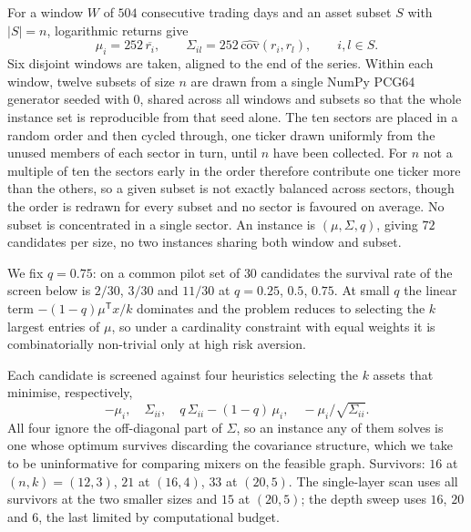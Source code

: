 For a window $W$ of $504$ consecutive trading days and an asset subset $S$ with $|S|=n$, logarithmic returns give
\begin{equation}
\mu_i = 252\,\overline{r_i}, \qquad \Sigma_{il} = 252\,\widehat{\mathrm{cov}}(r_i,r_l), \qquad i,l\in S .
  \label{eq:moments}
\end{equation}
Six disjoint windows are taken, aligned to the end of the series. Within each window, twelve subsets of size $n$ are drawn from a single NumPy PCG64 generator seeded with $0$, shared across all windows and subsets so that the whole instance set is reproducible from that seed alone. The ten sectors are placed in a random order and then cycled through, one ticker drawn uniformly from the unused members of each sector in turn, until $n$ have been collected. For $n$ not a multiple of ten the sectors early in the order therefore contribute one ticker more than the others, so a given subset is not exactly balanced across sectors, though the order is redrawn for every subset and no sector is favoured on average. No subset is concentrated in a single sector. An instance is $(\mu,\Sigma,q)$, giving $72$ candidates per size, no two instances sharing both window and subset.

We fix $q=0.75$: on a common pilot set of $30$ candidates
the survival rate of the screen below is $2/30$, $3/30$ and $11/30$ at $q=0.25$, $0.5$, $0.75$. At small $q$ the linear term $-(1-q)\mu^{\mathsf T}x/k$ dominates and the problem reduces to selecting the $k$ largest entries of $\mu$, so under a cardinality constraint with equal weights it is combinatorially non-trivial only at high risk aversion.

Each candidate is screened against four heuristics selecting the $k$ assets that minimise, respectively,
\begin{equation}
-\mu_i,\quad \Sigma_{ii},\quad q\,\Sigma_{ii}-(1-q)\,\mu_i,\quad -\mu_i/\sqrt{\Sigma_{ii}} .
  \label{eq:heuristics}
\end{equation}
All four ignore the off-diagonal part of $\Sigma$, so an instance any of them solves is one whose optimum survives discarding the covariance structure, which we take to be uninformative for comparing mixers on the feasible graph. Survivors: $16$ at $(n,k)=(12,3)$, $21$ at $(16,4)$, $33$ at $(20,5)$. The single-layer scan uses all survivors at the two smaller sizes and $15$ at $(20,5)$; the depth sweep uses $16$, $20$ and $6$, the last limited by computational budget.

